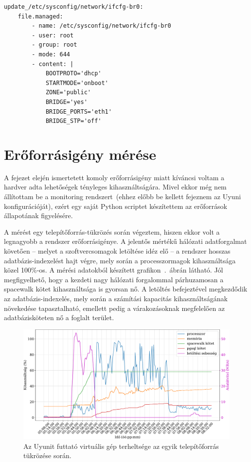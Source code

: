 \begin{lstlisting}[caption=A hálózati konfiguráció frissítését végző Salt state.,label=lst:vhost-salt-formula-mod]
update_/etc/sysconfig/network/ifcfg-br0:
	file.managed:
		- name: /etc/sysconfig/network/ifcfg-br0
		- user: root
		- group: root
		- mode: 644
		- content: |
			BOOTPROTO='dhcp'
			STARTMODE='onboot'
			ZONE='public'
			BRIDGE='yes'
			BRIDGE_PORTS='eth1'
			BRIDGE_STP='off'
\end{lstlisting}

\section{Erőforrásigény mérése}
A fejezet elején ismertetett komoly erőforrásigény miatt kíváncsi voltam a hardver adta lehetőségek tényleges kihasználtságára. Mivel ekkor még nem állítottam be a monitoring rendszert~(ehhez előbb be kellett fejeznem az Uyuni konfigurációját), ezért egy saját Python scriptet készítettem az erőforrások állapotának figyelésére.

A mérést egy telepítőforrás-tükrözés során végeztem, hiszen ekkor volt a legnagyobb a rendszer erőforrásigénye. A jelentős mértékű hálózati adatforgalmat követően -- melyet a szoftvercsomagok letöltése idéz elő -- a rendszer hosszas adatbázis-indexelést hajt végre, mely során a processzormagok kihasználtsága közel 100\%-os. A mérési adatokból készített grafikon~.~ábrán látható. Jól megfigyelhető, hogy a kezdeti nagy hálózati forgalommal párhuzamosan a spacewalk kötet kihasználtsága is gyorsan nő. A letöltés befejeztével megkezdődik az adatbázis-indexelés, mely során a számítási kapacitás kihasználtságának növekedése tapasztalható, emellett pedig a várakozásoknak megfelelően az adatbázisköteten nő a foglalt terület.


\begin{figure}[ht]
	\centering
	\includegraphics[width=15cm]{figures/reposync-leap-oss-grid.pdf}
	\caption{Az Uyunit futtató virtuális gép terheltsége az egyik telepítőforrás tükrözése során.}
	\label{fig:reposync-chart}
\end{figure}

